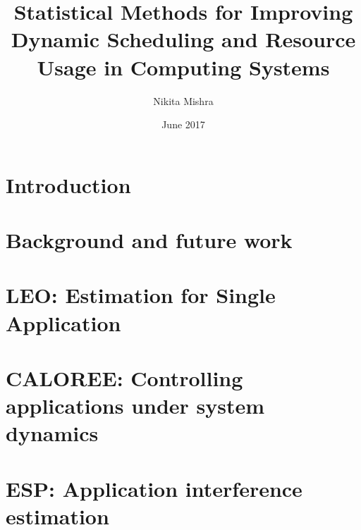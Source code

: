 \documentclass{ucetd}
\title{Statistical Methods for Improving Dynamic Scheduling and Resource Usage in Computing Systems}
\author{Nikita Mishra}
\date{June 2017}
\begin{document}
\maketitle

\makecopyright
\makededication
\tableofcontents
\listoffigures
\listoftables
\graphicspath{{figures/}} %

\acknowledgments



\mainmatter

\chapter{Introduction}

%
%
%

\chapter{Background and future work}

%
%
%

\chapter{LEO: Estimation for Single Application}
%







\chapter{CALOREE: Controlling applications under system dynamics}
%





\chapter{ESP: Application interference estimation}
%
%
%




\end{document}
